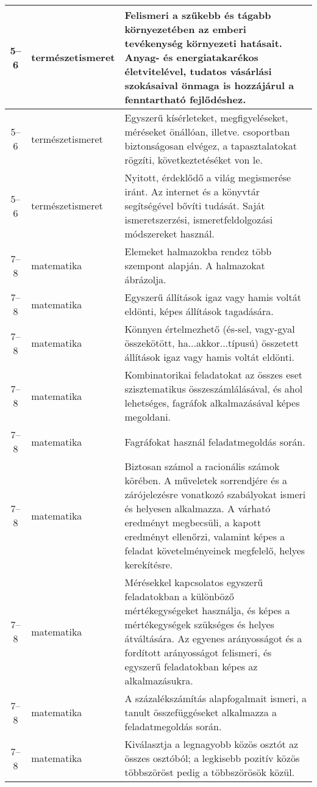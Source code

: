 \begin{small}
\begin{longtable}{c | p{2cm} |  p{11cm} }
              5--6 & természetismeret & Felismeri a szűkebb és tágabb környezetében az emberi tevékenység környezeti hatásait. Anyag- és energiatakarékos életvitelével, tudatos vásárlási szokásaival önmaga is hozzájárul a fenntartható fejlődéshez. \\ \hline
              5--6 & természetismeret & Egyszerű kísérleteket, megfigyeléseket, méréseket önállóan, illetve. csoportban biztonságosan elvégez, a tapasztalatokat rögzíti, következtetéséket von le. \\ \hline
              5--6 & természetismeret & Nyitott, érdeklődő a világ megismerése iránt. Az internet és a könyvtár segítségével bővíti tudását. Saját ismeretszerzési, ismeretfeldolgozási módszereket használ. \\ \hline
              7--8 & matematika & Elemeket halmazokba rendez több szempont alapján. A halmazokat ábrázolja. \\ \hline
              7--8 & matematika & Egyszerű állítások igaz vagy hamis voltát eldönti, képes állítások tagadására. \\ \hline
              7--8 & matematika & Könnyen értelmezhető (és-sel, vagy-gyal összekötött, ha...akkor...típusú) összetett állítások igaz vagy hamis voltát eldönti. \\ \hline
              7--8 & matematika & Kombinatorikai feladatokat az összes eset szisztematikus összeszámlálásával, és ahol lehetséges, fagráfok alkalmazásával képes megoldani. \\ \hline
              7--8 & matematika & Fagráfokat használ feladatmegoldás során. \\ \hline
              7--8 & matematika & Biztosan számol a racionális számok körében. A műveletek sorrendjére és a zárójelezésre vonatkozó szabályokat ismeri és helyesen alkalmazza. A várható eredményt megbecsüli, a kapott  eredményt ellenőrzi, valamint képes a feladat követelményeinek megfelelő, helyes kerekítésre. \\ \hline
              7--8 & matematika & Mérésekkel kapcsolatos egyszerű feladatokban a különböző mértékegységeket használja, és képes a mértékegységek szükséges és helyes átváltására. Az egyenes arányosságot és a fordított arányosságot felismeri, és egyszerű feladatokban képes az alkalmazásukra.
 \\ \hline
              7--8 & matematika & A százalékszámítás alapfogalmait ismeri, a tanult összefüggéseket alkalmazza a  feladatmegoldás során. \\ \hline
              7--8 & matematika & Kiválasztja a legnagyobb közös osztót az összes osztóból; a legkisebb pozitív közös többszöröst pedig a többszörösök közül. \\ \hline

\end{longtable}
\end{small}
